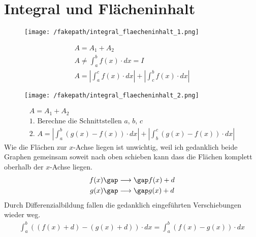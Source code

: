 \section{Integral und Flächeninhalt}
\begin{figure}[H]
  \centering
  \texttt{[image: /fakepath/integral\_flaecheninhalt\_1.png]}
\end{figure}
\begin{gather*}
  A = A_1 + A_2 \\
  A \neq \int_a^b f(x) \cdot dx = I \\
  A = |\int_a^c f(x) \cdot dx| + |\int_c^b f(x) \cdot dx|
\end{gather*}
\begin{figure}[H]
  \centering
  \texttt{[image: /fakepath/integral\_flaecheninhalt\_2.png]}
\end{figure}
\begin{gather*}
  A = A_1 + A_2 \\
  \text{1. Berechne die Schnittstellen $a$, $b$, $c$} \\
  \text{2. } A = |\int_a^b (g(x) - f(x)) \cdot dx| + |\int_b^c (g(x) - f(x)) \cdot dx|
\end{gather*}
Wie die Flächen zur $x$-Achse liegen ist unwichtig, weil ich gedanklich beide Graphen gemeinsam soweit nach oben schieben kann dass die Flächen komplett oberhalb der $x$-Achse liegen.
\begin{gather*}
  f(x) \gap\longrightarrow\gap f(x) + d \\
  g(x) \gap\longrightarrow\gap g(x) + d
\end{gather*}
Durch Differenzialbildung fallen die gedanklich eingeführten Verschiebungen wieder weg.
\begin{gather*}
  \int_a^b ((f(x) + d) - (g(x) + d)) \cdot dx = \int_a^b (f(x) - g(x)) \cdot dx
\end{gather*}
